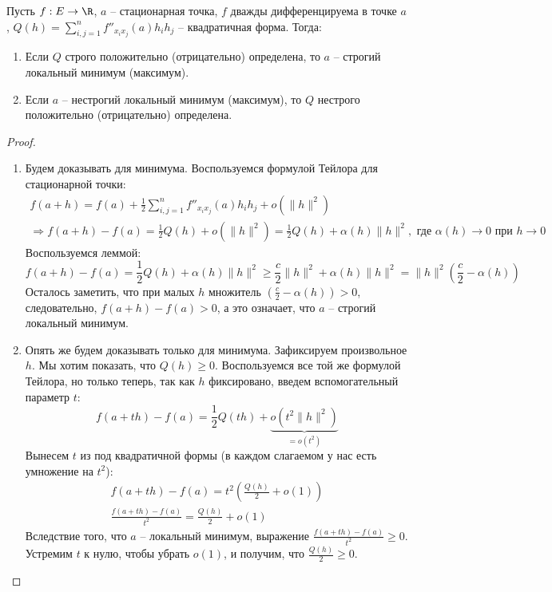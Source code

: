\begin{theorem} 
    Пусть $f: E \to \R$, $a$ -- стационарная точка, $f$ дважды дифференцируема в точке $a$, $Q(h) = \sum\limits_{i, j = 1}^n f''_{x_ix_j}(a)h_ih_j$ -- квадратичная форма. Тогда: \begin{enumerate}
        \item Если $Q$ строго положительно (отрицательно) определена, то $a$ -- строгий локальный минимум (максимум).
        \item Если $a$ -- нестрогий локальный минимум (максимум), то $Q$ нестрого положительно (отрицательно) определена.
    \end{enumerate}
\end{theorem}
\begin{proof} \quad
    \begin{enumerate}
        \item Будем доказывать для минимума.
        Воспользуемся формулой Тейлора для стационарной точки: \begin{gather*}
            f(a + h) = f(a) + \frac{1}{2} \sum_{i, j = 1}^n f''_{x_ix_j}(a)h_ih_j + o(\|h\|^2) \\
            \Rightarrow f(a + h) - f(a) = \frac{1}{2}Q(h) + o(\|h\|^2) = \frac{1}{2}Q(h) + \alpha(h)\|h\|^2, \text{ где } \alpha(h) \to 0 \text{ при } h \to 0
        \end{gather*}
        Воспользуемся леммой: \[ f(a+h) - f(a) =  \frac{1}{2}Q(h) + \alpha(h)\|h\|^2 \geqslant \frac{c}{2}\|h\|^2 + \alpha(h)\|h\|^2 = \|h\|^2 \left(\frac{c}{2} - \alpha(h) \right)  \]
        Осталось заметить, что при малых $h$ множитель $(\frac{c}{2} - \alpha(h)) > 0$, следовательно, $f(a + h) - f(a) > 0$, а это означает, что $a$ -- строгий локальный минимум.
        \item Опять же будем доказывать только для минимума. 
        Зафиксируем произвольное $h$.
        Мы хотим показать, что $Q(h) \geqslant 0$. 
        Воспользуемся все той же формулой Тейлора, но только теперь, так как $h$ фиксировано, введем вспомогательный параметр $t$:
        \[ f(a + th) - f(a) = \frac{1}{2}Q(th) + \underbrace{o(t^2\|h\|^2)}_{= o(t^2)} \]
        Вынесем $t$ из под квадратичной формы (в каждом слагаемом у нас есть умножение на $t^2$): 
        \begin{gather*}
            f(a + th) - f(a) = t^2 \left(\frac{Q(h)}{2} + o(1) \right) \\
            \frac{f(a + th) - f(a)}{t^2} = \frac{Q(h)}{2} + o(1)
        \end{gather*}
        Вследствие того, что $a$ -- локальный минимум, выражение $\frac{f(a + th) - f(a)}{t^2} \geqslant 0$.
        Устремим $t$ к нулю, чтобы убрать $o(1)$, и получим, что $\frac{Q(h)}{2} \geqslant 0$.
    \end{enumerate}
\end{proof}


